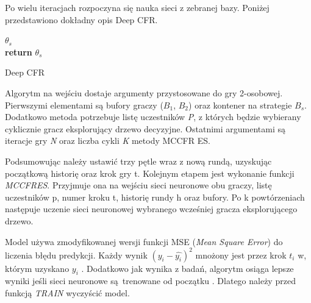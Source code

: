 \documentclass[12pt,oneside,a4paper]{report}
\begin{document}
Po wielu iteracjach
rozpoczyna się nauka sieci z zebranej bazy. Poniżej przedstawiono dokładny opis Deep CFR.
\vspace{1cm}

\begin{algorithm}[H]
\DontPrintSemicolon
  
$\theta_{s}$ \leftarrow {} \\
\textbf{return} $\theta_{s}$
 \caption{Deep CFR}
\end{algorithm}

\vspace{1cm}
Algorytm na wejściu dostaje argumenty przystosowane do gry 2-osobowej.
Pierwszymi elementami są bufory graczy ($B_{1}$, $B_{2}$) oraz kontener na 
strategie $B_{s}$.
Dodatkowo metoda potrzebuje listę uczestników \emph{P}, z których będzie wybierany cyklicznie gracz
eksplorujący drzewo decyzyjne.
Ostatnimi argumentami są iteracje gry \emph{N} oraz liczba cykli \emph{K} metody MCCFR ES.


Podsumowując należy ustawić trzy pętle wraz z nową rundą, uzyskując początkową historię oraz
krok gry t. Kolejnym etapem jest
wykonanie funkcji \emph{MCCFRES}. Przyjmuje ona na wejściu sieci neuronowe obu graczy, 
listę uczestników p,
numer kroku t, historię rundy h oraz bufory. Po k 
powtórzeniach następuje uczenie sieci neuronowej wybranego wcześniej gracza eksplorującego drzewo. 

Model używa 
zmodyfikowanej wersji funkcji MSE (\emph{Mean Square Error}) do liczenia błędu predykcji. Każdy wynik $(y_{i} - \hat{y_{i}})^2$
mnożony jest przez krok $t_{i}$ w, którym uzyskano $y_{i}$ \cite{DCFR}.
Dodatkowo jak wynika z badań, algorytm osiąga lepsze wyniki
jeśli
sieci neuronowe są trenowane od początku \cite{DCFR}. Dlatego należy przed funkcją \emph{TRAIN}
wyczyścić model.
\end{document}
